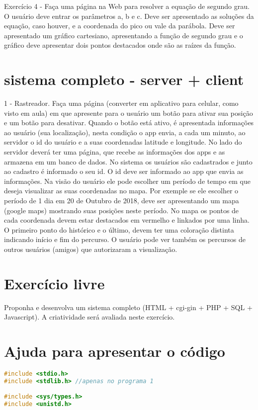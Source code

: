 \documentclass[11pt]{amsart}
\begin{document}
Exercício 4 - Faça uma página na Web para resolver a equação de segundo grau. O usuário deve entrar os parâmetros a, b e c. Deve ser apresentado as soluções da equação, caso houver, e a coordenada do pico ou vale da parábola. Deve ser apresentado um gráfico cartesiano, apresentando a função de segundo grau e o gráfico deve apresentar dois pontos destacados onde são as raízes da função. 

\section{sistema completo - server + client}
1 - Rastreador. Faça uma página (converter em aplicativo para celular, como visto em aula) em que apresente para o usuário um botão para ativar sua posição e um botão para desativar. Quando o botão está ativo, é apresentada informações ao usuário (sua localização), nesta condição o app envia, a cada um minuto, ao servidor o id do usuário e a suas coordenadas latitude e longitude. 
No lado do servidor deverá ter uma página, que recebe as informações dos apps e as armazena em um banco de dados. 
No sistema os usuários são cadastrados e junto ao cadastro é informado o seu id. O id deve ser informado ao app que envia as informações. 
Na visão do usuário ele pode escolher um período de tempo em que deseja visualizar as suas coordenadas no mapa. Por exemple se ele escolher o período de 1 dia em 20 de Outubro de 2018, deve ser apresentando um mapa (google maps) mostrando suas posições neste período. No mapa os pontos de cada coordenada devem estar destacados em vermelho e linkados por uma linha. O primeiro ponto do histórico e o último, devem ter uma coloração distinta indicando início e fim do percurso. O usuário pode ver também os percursos de outros usuários (amigos) que autorizaram a visualização. 

\section{Exercício livre}
Proponha e desenvolva um sistema completo (HTML + cgi-gin + PHP + SQL + Javascript). A criatividade será avaliada neste exercício.  

\section{Ajuda para apresentar o código}


\vspace{.5cm}
\begin{lstlisting}[caption ={Bibliotecas utilizadas.},language=C]
#include <stdio.h>
#include <stdlib.h> //apenas no programa 1

#include <sys/types.h>
#include <unistd.h>
\end{lstlisting}
\vspace{.5cm}
\end{document}
